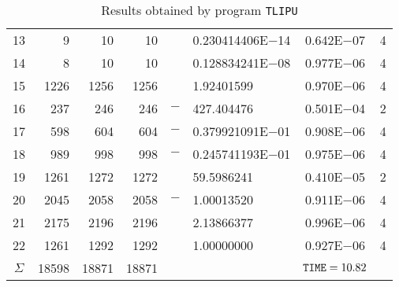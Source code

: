 \documentclass{esub2acm}
\begin{document}
\begin{table}
\begin{tabular}{c|rrrr@{}lcc}
13  &   9   &   10  &   10  &       &   0.230414406E$-$14   &   0.642E$-$07 &   4   \\
14  &   8   &   10  &   10  &       &   0.128834241E$-$08   &   0.977E$-$06 &   4   \\
15  &   1226    &   1256    &   1256    &       &   1.92401599  &   0.970E$-$06 &   4   \\
16  &   237 &   246 &   246 &   $-$ &   427.404476  &   0.501E$-$04 &   2   \\
17  &   598 &   604 &   604 &   $-$ &   0.379921091E$-$01   &   0.908E$-$06 &   4   \\
18  &   989 &   998 &   998 &   $-$ &   0.245741193E$-$01   &   0.975E$-$06 &   4   \\
19  &   1261    &   1272    &   1272    &       &   59.5986241  &   0.410E$-$05 &   2   \\
20  &   2045    &   2058    &   2058    &   $-$ &   1.00013520  &   0.911E$-$06 &   4   \\
21  &   2175    &   2196    &   2196    &       &   2.13866377  &   0.996E$-$06 &   4   \\
22  &   1261    &   1292    &   1292    &       &   1.00000000  &   0.927E$-$06 &   4   \\ \hline
$\Sigma$\rule[-2pt]{0pt}{12pt}  &   18598   &   18871   &   18871   &       &       &   ${\tt TIME} = 10.82$    &       \\ \hline
\end{tabular}
\caption{Results obtained by program {\tt TLIPU}}
\label{tlipu}
\end{table}
\end{document}
